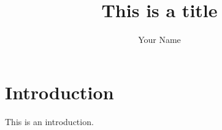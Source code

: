 \documentclass[10pt,journal,cspaper,compsoc]{IEEEtran}
\begin{document}
\title{This is a title}
\author{Your Name}

\maketitle

\section{Introduction}
This is an introduction.
\end{document}
